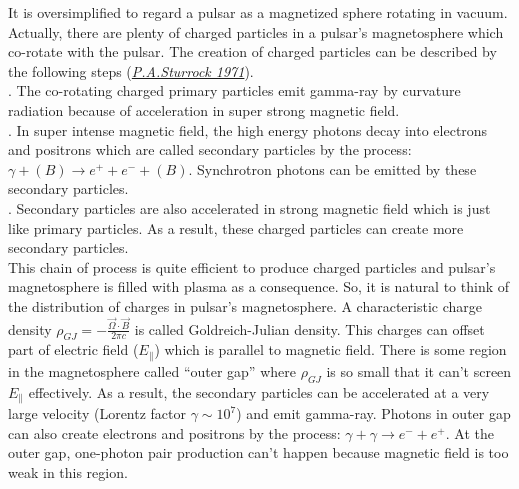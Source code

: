 \documentclass[12pt]{report}
\begin{document}
              It is oversimplified to regard a pulsar as a magnetized sphere rotating in vacuum. Actually,
              there are plenty of 
              charged particles in a pulsar's magnetosphere which co-rotate with the pulsar. The creation of 
              charged particles can 
              be described by the following steps 
              (\href{http://articles.adsabs.harvard.edu/cgi-bin/nph-iarticle\_query?1971...164..529S&amp;data
              \_type=PDF\_HIGH&amp;whole\_paper=YES&amp;type=PRINTER&amp;filetype=.pdf}{\textit{P.A.Sturrock
              1971}}). \\ 
              . The co-rotating charged primary particles emit gamma-ray by curvature radiation 
              because of acceleration in super strong magnetic field.  \\
              . In super intense magnetic field,  the high energy photons decay into electrons and 
              positrons which are called secondary particles by the process: 
              $\gamma + (B) \rightarrow e^++e^-+(B)$. Synchrotron 
                                  photons can be emitted by these secondary particles. \\
              . Secondary particles are also accelerated in strong magnetic field which is just like 
              primary particles. As a result, these charged particles can create more secondary particles. \\
              \indent This chain of process is quite efficient to produce charged particles and pulsar's 
              magnetosphere is filled with plasma as a consequence. So, it is natural to think of the 
              distribution of charges in pulsar's magnetosphere. A characteristic charge density 
              $\rho_{GJ}=-\frac{\vec{\Omega}\cdot \vec{B}}{2\pi c}$ is called Goldreich-Julian density. 
              This charges can offset part of electric field ($E_{\parallel}$) which is parallel to magnetic 
              field. There is some region in the magnetosphere called ``outer gap'' where $\rho_{GJ}$ is so 
              small that it can't screen $E_{\parallel}$ effectively. As a result, the secondary particles can 
              be accelerated at a very large velocity (Lorentz factor $\gamma\sim 10^7$) and emit gamma-ray. 
              Photons in outer gap can also create electrons and positrons by the process: 
              $\gamma+\gamma\rightarrow e^-+e^+$. At the outer gap, one-photon pair production can't happen 
              because magnetic field is too weak in this region.
 
\end{document}
